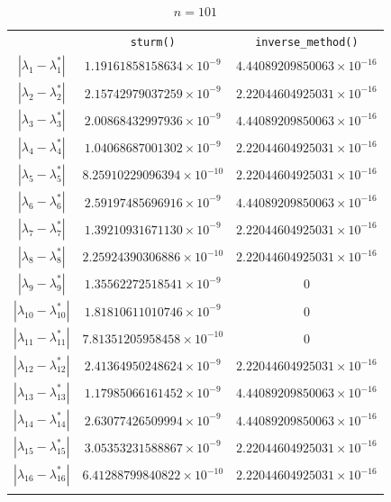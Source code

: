 \documentclass[UTF8,a4paper,10pt]{ctexart}
\begin{document}
        \begin{table}[htbp]%
            \centering
            \label{tab:1}  
            \begin{tabular}{ccc}%
                \hline\hline\noalign{\smallskip}	
                \  & \texttt{sturm()} & \texttt{inverse\_method()} \\
                \noalign{\smallskip}\hline\noalign{\smallskip}
                $\left|\lambda_1-\lambda_1^*\right|$ & $1.19161858158634\times 10^{-9}$ & $4.44089209850063\times 10^{-16}$ \\
                $\left|\lambda_2-\lambda_2^*\right|$ & $2.15742979037259\times 10^{-9}$ & $2.22044604925031\times 10^{-16}$ \\
                $\left|\lambda_3-\lambda_3^*\right|$ & $2.00868432997936\times 10^{-9}$ & $4.44089209850063\times 10^{-16}$ \\
                $\left|\lambda_4-\lambda_4^*\right|$ & $1.04068687001302\times 10^{-9}$ & $2.22044604925031\times 10^{-16}$ \\
                $\left|\lambda_5-\lambda_5^*\right|$ & $8.25910229096394\times 10^{-10}$ & $2.22044604925031\times 10^{-16}$ \\
                $\left|\lambda_6-\lambda_6^*\right|$ & $2.59197485696916\times 10^{-9}$ & $4.44089209850063\times 10^{-16}$ \\
                $\left|\lambda_7-\lambda_7^*\right|$ & $1.39210931671130\times 10^{-9}$ & $2.22044604925031\times 10^{-16}$ \\
                $\left|\lambda_8-\lambda_8^*\right|$ & $2.25924390306886\times 10^{-10}$ & $2.22044604925031\times 10^{-16}$ \\
                $\left|\lambda_9-\lambda_9^*\right|$ & $1.35562272518541\times 10^{-9}$ & $0$ \\
                $\left|\lambda_{10}-\lambda_{10}^*\right|$ & $1.81810611010746\times 10^{-9}$ & $0$ \\
                $\left|\lambda_{11}-\lambda_{11}^*\right|$ & $7.81351205958458\times 10^{-10}$ & $0$ \\
                $\left|\lambda_{12}-\lambda_{12}^*\right|$ & $2.41364950248624\times 10^{-9}$ & $2.22044604925031\times 10^{-16}$ \\
                $\left|\lambda_{13}-\lambda_{13}^*\right|$ & $1.17985066161452\times 10^{-9}$ & $4.44089209850063\times 10^{-16}$ \\
                $\left|\lambda_{14}-\lambda_{14}^*\right|$ & $2.63077426509994\times 10^{-9}$ & $4.44089209850063\times 10^{-16}$ \\
                $\left|\lambda_{15}-\lambda_{15}^*\right|$ & $3.05353231588867\times 10^{-9}$ & $2.22044604925031\times 10^{-16}$ \\
                $\left|\lambda_{16}-\lambda_{16}^*\right|$ & $6.41288799840822\times 10^{-10}$ & $2.22044604925031\times 10^{-16}$ \\
                \noalign{\smallskip}\hline
            \end{tabular}
            \caption{$n=101$}
        \end{table}
\end{document}
